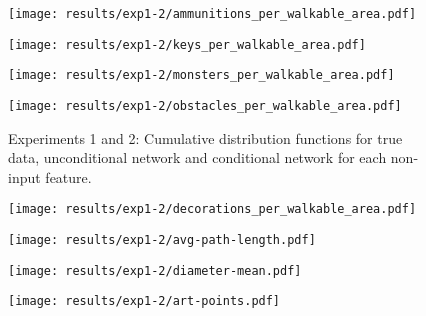 \begin{figure}[ht]
	
	\begin{minipage}[b]{0.45\linewidth}
		\centering
		\texttt{[image: results/exp1-2/ammunitions\_per\_walkable\_area.pdf]} 
		\label{fig:results-noninput-ammunitions_per_walkable_area}
	\end{minipage}
	\begin{minipage}[b]{0.45\linewidth}
		\centering
		\texttt{[image: results/exp1-2/keys\_per\_walkable\_area.pdf]} 
		\label{fig:results-noninput-keys_per_walkable_area}
	\end{minipage} 
	
	
	\begin{minipage}[b]{0.45\linewidth}
		\centering
		\texttt{[image: results/exp1-2/monsters\_per\_walkable\_area.pdf]} 
		\label{fig:results-noninput-monsters_per_walkable_area}
	\end{minipage}
	\begin{minipage}[b]{0.45\linewidth}
		\centering
		\texttt{[image: results/exp1-2/obstacles\_per\_walkable\_area.pdf]} 
		\label{fig:results-noninput-obstacles_per_walkable_area}
	\end{minipage} 
	
	
	\caption[Graphical results for experiments 1 and 2]{Experiments 1 and 2: Cumulative distribution functions for true data, unconditional network and conditional network for each non-input feature.}
\end{figure}\begin{figure}[ht]
	\begin{minipage}[b]{0.45\linewidth}
		\centering
		\texttt{[image: results/exp1-2/decorations\_per\_walkable\_area.pdf]} 
		\label{fig:results-noninput-decorations_per_walkable_area}
	\end{minipage}
	\begin{minipage}[b]{0.45\linewidth}
		\centering
		\texttt{[image: results/exp1-2/avg-path-length.pdf]} 
		\label{fig:results-noninput-avg-path-length}
	\end{minipage} 
	
	
	\begin{minipage}[b]{0.45\linewidth}
		\centering
		\texttt{[image: results/exp1-2/diameter-mean.pdf]} 
		\label{fig:results-noninput-diameter-mean}
	\end{minipage}
	\begin{minipage}[b]{0.45\linewidth}
		\centering
		\texttt{[image: results/exp1-2/art-points.pdf]} 
		\label{fig:results-noninput-art-points}
	\end{minipage} 
	

\end{figure}
